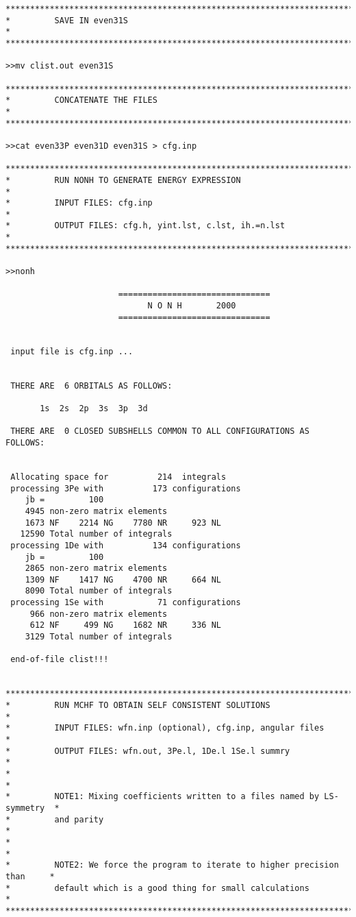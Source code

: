 \documentclass[fleqn,10pt]{book}
\begin{document}
\begin{verbatim}
*******************************************************************************
*         SAVE IN even31S                                                     *
*******************************************************************************

>>mv clist.out even31S

*******************************************************************************
*         CONCATENATE THE FILES                                               *
*******************************************************************************

>>cat even33P even31D even31S > cfg.inp

*******************************************************************************
*         RUN NONH TO GENERATE ENERGY EXPRESSION                              *
*         INPUT FILES: cfg.inp                                                *
*         OUTPUT FILES: cfg.h, yint.lst, c.lst, ih.=n.lst                     *
*******************************************************************************

>>nonh

                       ===============================
                             N O N H       2000
                       ===============================


 input file is cfg.inp ...


 THERE ARE  6 ORBITALS AS FOLLOWS:

       1s  2s  2p  3s  3p  3d

 THERE ARE  0 CLOSED SUBSHELLS COMMON TO ALL CONFIGURATIONS AS FOLLOWS:


 Allocating space for          214  integrals
 processing 3Pe with          173 configurations
    jb =         100
    4945 non-zero matrix elements
    1673 NF    2214 NG    7780 NR     923 NL
   12590 Total number of integrals
 processing 1De with          134 configurations
    jb =         100
    2865 non-zero matrix elements
    1309 NF    1417 NG    4700 NR     664 NL
    8090 Total number of integrals
 processing 1Se with           71 configurations
     966 non-zero matrix elements
     612 NF     499 NG    1682 NR     336 NL
    3129 Total number of integrals

 end-of-file clist!!!


*******************************************************************************
*         RUN MCHF TO OBTAIN SELF CONSISTENT SOLUTIONS                        *
*         INPUT FILES: wfn.inp (optional), cfg.inp, angular files             *
*         OUTPUT FILES: wfn.out, 3Pe.l, 1De.l 1Se.l summry                    *
*                                                                             *
*         NOTE1: Mixing coefficients written to a files named by LS-symmetry  *
*         and parity                                                          *
*                                                                             *
*         NOTE2: We force the program to iterate to higher precision than     *
*         default which is a good thing for small calculations                *
*******************************************************************************


\end{verbatim}
\end{document}
